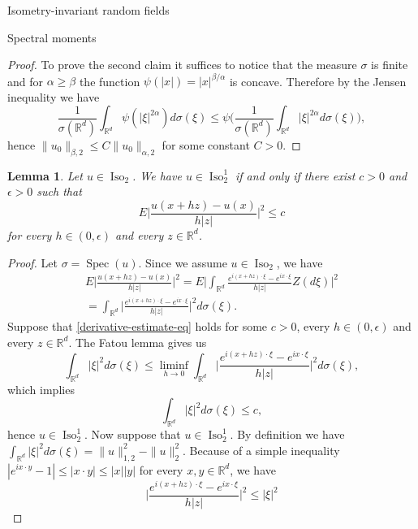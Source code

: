 \documentclass[a4paper,10pt,fleqn]{amsart}
\newtheorem{lemma}[theorem]{Lemma}
\theoremstyle{remark}
\theoremstyle{definition}
\DeclareMathOperator{\Iso}{Iso}
\DeclareMathOperator{\Spec}{Spec}
\newcommand{\X} {{\mathbb{R}^d}}
\renewcommand{\=} {\overset{d}{=}}
\begin{document}
\begin{section}{Isometry-invariant random fields}
\begin{subsection}{Spectral moments}
\begin{proof}
  To prove the second claim it suffices to notice that the measure $\sigma$ is finite and for $\alpha \geq \beta$ the function $\psi(|x|) = |x|^{\beta/\alpha}$ is concave. Therefore by the Jensen inequality
  we have
  \begin{equation*}
   \frac{1}{\sigma(\X)}\int_\X\psi(|\xi|^{2\alpha})d\sigma(\xi)\leq\psi\Big(\frac{1}{\sigma(\X)}\int_\X|\xi|^{2\alpha}d\sigma(\xi)\Big),
  \end{equation*}
  hence $\|u_0\|_{\beta,2}\leq C\|u_0\|_{\alpha,2}$ for some constant $C>0$.
 \end{proof}
    \begin{lemma}\label{derivative-estimate}
     Let $u\in\Iso_2$. We have $u\in\Iso^1_2$ if and only if there exist $c>0$ and $\epsilon>0$ such that 
      \begin{equation}\label{derivative-estimate-eq}
        E\Big|\frac{u(x+hz)-u(x)}{h|z|}\Big|^2 \leq c
      \end{equation}
      for every $h\in(0,\epsilon)$ and every $z\in\X$.
    \end{lemma}
    \begin{proof}Let $\sigma=\Spec(u)$. Since we assume $u\in\Iso_2$, we have
     \begin{multline}\label{spectral-something}
        E\Big|\frac{u(x+hz)-u(x)}{h|z|}\Big|^2 = E\Big|\int_\X\frac{e^{i(x+hz)\cdot\xi}-e^{ix\cdot\xi}}{h|z|}Z(d\xi)\Big|^2 \\
        = \int_\X\Big|\frac{e^{i(x+hz)\cdot\xi}-e^{ix\cdot\xi}}{h|z|}\Big|^2d\sigma(\xi).
      \end{multline}
      Suppose that \eqref{derivative-estimate-eq} holds for some $c>0$, every $h\in(0,\epsilon)$ and every $z\in\X$. The Fatou lemma gives us
      \begin{equation*}
       \int_\X |\xi|^2 d\sigma(\xi) \leq \liminf_{h\to0}\int_\X\Big|\frac{e^{i(x+hz)\cdot\xi}-e^{ix\cdot\xi}}{h|z|}\Big|^2d\sigma(\xi),
      \end{equation*}
      which implies
      \begin{equation*}
       \int_\X |\xi|^2 d\sigma(\xi) \leq c,
      \end{equation*}
     hence $u\in\Iso^1_2$.
      Now suppose that $u\in\Iso^1_2$. By definition we have $\int_\X|\xi|^{2}d\sigma(\xi) = \|u\|_{1,2}^2- \|u\|_{2}^2$.
      Because of a simple inequality $|e^{ix\cdot y}-1|\leq|x\cdot y|\leq|x||y|$ for every $x,y\in\X$, we have
      \begin{equation*}
       \Big|\frac{e^{i(x+hz)\cdot\xi}-e^{ix\cdot\xi}}{h|z|}\Big|^2\leq|\xi|^2

\end{equation*}
\end{proof}
\end{subsection}
\end{section}
\end{document}
